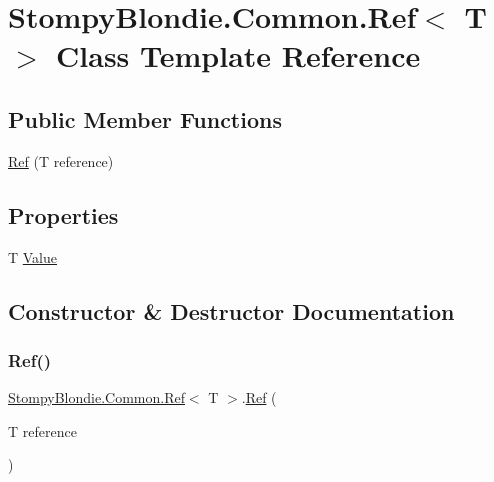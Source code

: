 \hypertarget{class_stompy_blondie_1_1_common_1_1_ref}{}\section{Stompy\+Blondie.\+Common.\+Ref$<$ T $>$ Class Template Reference}
\label{class_stompy_blondie_1_1_common_1_1_ref}
\subsection*{Public Member Functions}
\begin{DoxyCompactItemize}
\item 
\mbox{\hyperlink{class_stompy_blondie_1_1_common_1_1_ref_aee4416d4052c496f2243b78d2227b634}{Ref}} (T reference)
\end{DoxyCompactItemize}
\subsection*{Properties}
\begin{DoxyCompactItemize}
\item 
T \mbox{\hyperlink{class_stompy_blondie_1_1_common_1_1_ref_affb9fdf7ad5b2ccb82519015357364a1}{Value}}
\end{DoxyCompactItemize}


\subsection{Constructor \& Destructor Documentation}
\mbox{\label{class_stompy_blondie_1_1_common_1_1_ref_aee4416d4052c496f2243b78d2227b634}} 
\subsubsection{\texorpdfstring{Ref()}{Ref()}}
{\footnotesize\ttfamily \mbox{\hyperlink{class_stompy_blondie_1_1_common_1_1_ref}{Stompy\+Blondie.\+Common.\+Ref}}$<$ T $>$.\mbox{\hyperlink{class_stompy_blondie_1_1_common_1_1_ref}{Ref}} (\begin{DoxyParamCaption}\item[{T}]{reference }\end{DoxyParamCaption})\hspace{0.3cm}{\ttfamily [inline]}}



